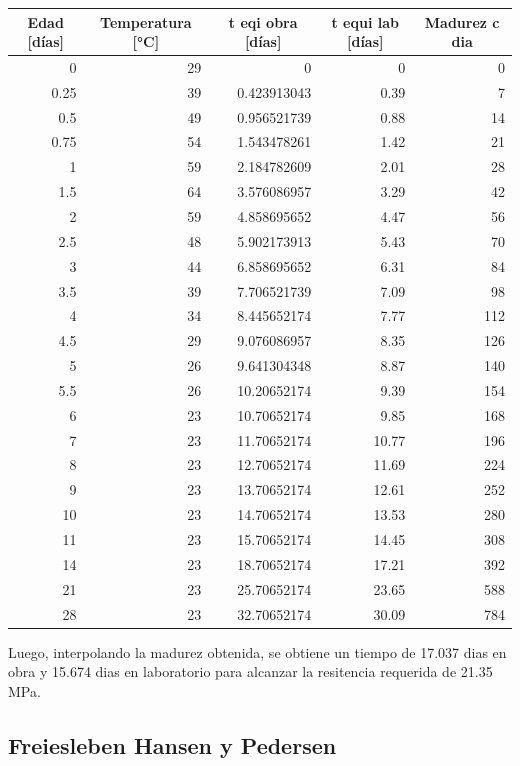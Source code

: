 \begin{table}[H]
\centering
\renewcommand{\arraystretch}{1.15}
\begin{tabular}{r r r r r}
\hline
\multicolumn{1}{c}{Edad [días]} & \multicolumn{1}{c}{Temperatura [°C]} & \multicolumn{1}{c}{t eqi obra [días]} & \multicolumn{1}{c}{t equi lab [días]} & \multicolumn{1}{c}{Madurez c dia} \\
\hline
0 & 29 & 0 & 0 & 0 \\
0.25 & 39 & 0.423913043 & 0.39 & 7 \\
0.5 & 49 & 0.956521739 & 0.88 & 14 \\
0.75 & 54 & 1.543478261 & 1.42 & 21 \\
1 & 59 & 2.184782609 & 2.01 & 28 \\
1.5 & 64 & 3.576086957 & 3.29 & 42 \\
2 & 59 & 4.858695652 & 4.47 & 56 \\
2.5 & 48 & 5.902173913 & 5.43 & 70 \\
3 & 44 & 6.858695652 & 6.31 & 84 \\
3.5 & 39 & 7.706521739 & 7.09 & 98 \\
4 & 34 & 8.445652174 & 7.77 & 112 \\
4.5 & 29 & 9.076086957 & 8.35 & 126 \\
5 & 26 & 9.641304348 & 8.87 & 140 \\
5.5 & 26 & 10.20652174 & 9.39 & 154 \\
6 & 23 & 10.70652174 & 9.85 & 168 \\
7 & 23 & 11.70652174 & 10.77 & 196 \\
8 & 23 & 12.70652174 & 11.69 & 224 \\
9 & 23 & 13.70652174 & 12.61 & 252 \\
10 & 23 & 14.70652174 & 13.53 & 280 \\
11 & 23 & 15.70652174 & 14.45 & 308 \\
14 & 23 & 18.70652174 & 17.21 & 392 \\
21 & 23 & 25.70652174 & 23.65 & 588 \\
28 & 23 & 32.70652174 & 30.09 & 784 \\
\hline
\end{tabular}
\end{table}

Luego, interpolando la madurez obtenida, se obtiene un tiempo de 17.037 dias en obra y 15.674 dias en laboratorio para alcanzar la resitencia requerida de 21.35 MPa.

\subsection*{Freiesleben Hansen y Pedersen}

